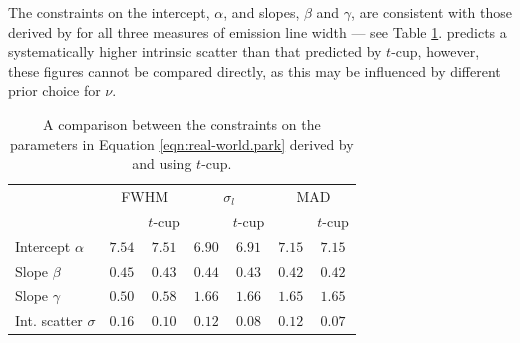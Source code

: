 \documentclass[fleqn,usenatbib]{rasti}
\begin{document}
The constraints on the intercept, $\alpha$, and slopes, $\beta$ and $\gamma$,
are consistent with those derived by \citet{Park:2017} for all three measures of
emission line width --- see Table \ref{tab:real-world.park.params}.
\citet{Park:2017} predicts a systematically higher intrinsic scatter than that
predicted by $t$-cup, however, these figures cannot be compared directly, as
this may be influenced by different prior choice for $\nu$.

\begin{table}
	\centering
	\caption{A comparison between the constraints on the parameters in Equation
	\ref{eqn:real-world.park} derived by \citet{Park:2017} and using $t$-cup.}
	\label{tab:real-world.park.params}
	\begin{tabular}{lcc|cc|cc} %
                          & \multicolumn{2}{c}{FWHM} & \multicolumn{2}{c}{$\sigma_l$} & \multicolumn{2}{c}{MAD} \\
                          & \citet{Park:2017} & $t$-cup & \citet{Park:2017} & $t$-cup & \citet{Park:2017} & $t$-cup \\
    Intercept $\alpha$    & $7.54$\raisebox{0.5ex}{\tiny$^{+0.26}_{-0.27}$} & $7.51$\raisebox{0.5ex}{\tiny$^{+0.22}_{-0.22}$} & $6.90$\raisebox{0.5ex}{\tiny$^{+0.35}_{-0.34}$} & $6.91$\raisebox{0.5ex}{\tiny$^{+0.30}_{-0.31}$} & $7.15$\raisebox{0.5ex}{\tiny$^{+0.24}_{-0.25}$} & $7.15$\raisebox{0.5ex}{\tiny$^{+0.22}_{-0.22}$} \\
    Slope $\beta$         & $0.45$\raisebox{0.5ex}{\tiny$^{+0.08}_{-0.08}$} & $0.43$\raisebox{0.5ex}{\tiny$^{+0.06}_{-0.06}$} & $0.44$\raisebox{0.5ex}{\tiny$^{+0.07}_{-0.07}$} & $0.43$\raisebox{0.5ex}{\tiny$^{+0.05}_{-0.06}$} & $0.42$\raisebox{0.5ex}{\tiny$^{+0.07}_{-0.07}$} & $0.42$\raisebox{0.5ex}{\tiny$^{+0.05}_{-0.06}$} \\
    Slope $\gamma$        & $0.50$\raisebox{0.5ex}{\tiny$^{+0.55}_{-0.53}$} & $0.58$\raisebox{0.5ex}{\tiny$^{+0.44}_{-0.45}$} & $1.66$\raisebox{0.5ex}{\tiny$^{+0.65}_{-0.66}$} & $1.66$\raisebox{0.5ex}{\tiny$^{+0.57}_{-0.58}$} & $1.65$\raisebox{0.5ex}{\tiny$^{+0.61}_{-0.62}$} & $1.65$\raisebox{0.5ex}{\tiny$^{+0.55}_{-0.55}$} \\
    Int. scatter $\sigma$ & $0.16$\raisebox{0.5ex}{\tiny$^{+0.10}_{-0.08}$} & $0.10$\raisebox{0.5ex}{\tiny$^{+0.03}_{-0.10}$} & $0.12$\raisebox{0.5ex}{\tiny$^{+0.09}_{-0.06}$} & $0.08$\raisebox{0.5ex}{\tiny$^{+0.02}_{-0.08}$} & $0.12$\raisebox{0.5ex}{\tiny$^{+0.09}_{-0.06}$} & $0.07$\raisebox{0.5ex}{\tiny$^{+0.02}_{-0.07}$} \\
    \end{tabular}
\end{table}
\end{document}
